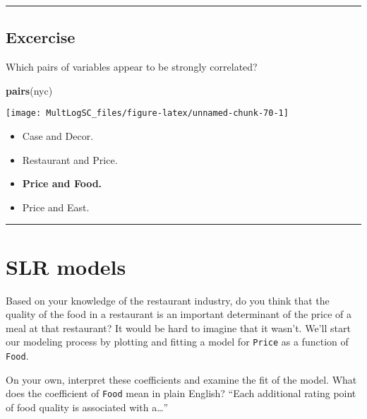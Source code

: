 \documentclass[
]{book}
\newenvironment{Shaded}{\begin{snugshade}}{\end{snugshade}}
\newcommand{\KeywordTok}[1]{\textcolor[rgb]{0.13,0.29,0.53}{\textbf{#1}}}
\newcommand{\NormalTok}[1]{#1}
\begin{document}
\begin{center}\rule{0.5\linewidth}{0.5pt}\end{center}

\hypertarget{excercise}{%
\subsection*{Excercise}\label{excercise}}

Which pairs of variables appear to be strongly correlated?

\begin{Shaded}
\begin{Highlighting}[]
\KeywordTok{pairs}\NormalTok{(nyc)}
\end{Highlighting}
\end{Shaded}

\begin{center}\texttt{[image: MultLogSC\_files/figure-latex/unnamed-chunk-70-1]} \end{center}

\begin{itemize}
\item
  Case and Decor.
\item
  Restaurant and Price.
\item
  \textbf{Price and Food.}
\item
  Price and East.
\end{itemize}

\begin{center}\rule{0.5\linewidth}{0.5pt}\end{center}

\hypertarget{slr-models}{%
\section{SLR models}\label{slr-models}}

Based on your knowledge of the restaurant industry, do you think that the quality of the food in a restaurant is an important determinant of the price of a meal at that restaurant? It would be hard to imagine that it wasn't. We'll start our modeling process by plotting and fitting a model for \texttt{Price} as a function of \texttt{Food}.

On your own, interpret these coefficients and examine the fit of the model. What does the coefficient of \texttt{Food} mean in plain English? ``Each additional rating point of food quality is associated with a\ldots{}''
\end{document}
